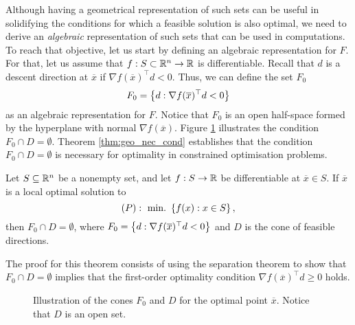 Although having a geometrical representation of such sets can be useful in solidifying the conditions for which a feasible solution is also optimal, we need to derive an \emph{algebraic} representation of such sets that can be used in computations. To reach that objective, let us start by defining an algebraic representation for $F$. For that, let us assume that $f : S \subset \mathbb{R}^n \to \mathbb{R}$ is differentiable. Recall that $d$ is a descent direction at $\overline{x}$ if $\nabla f(\overline{x})^\top d < 0$. Thus, we can define the set $F_0$
%
\begin{align*}
	F_0 = \left\{ d : \nabla f(\overline{x})^\top d < 0 \right \}	
\end{align*}
%
as an algebraic representation for $F$. Notice that $F_0$ is an open half-space formed by the hyperplane with normal $\nabla f(\overline{x})$. Figure \ref{cones_F0_D} illustrates the condition $F_0 \cap D = \emptyset$.
Theorem \ref{thm:geo_nec_cond} establishes that the condition $F_0 \cap D = \emptyset$ is necessary for optimality in constrained optimisation problems.
%
\begin{theorem}\label{thm:geo_nec_cond}
Let $S \subseteq \mathbb{R}^n$ be a nonempty set, and let $f:S \rightarrow \mathbb{R}$ be differentiable at $\overline{x} \in S$. If $\overline{x}$ is a local optimal solution to\\[-10pt]
$$(P) :~ \mathop{\text{min.~}}\left\{ f(x) : x \in S \right \},$$ 
then $F_0 \cap D = \emptyset$, where $F_0 = \left\{ d : \nabla f(\overline{x})^\top d < 0 \right \}$ and $D$ is the cone of feasible directions.
\end{theorem}
%
The proof for this theorem consists of using the separation theorem to show that $F_0 \cap D = \emptyset$ implies that the first-order optimality condition $\nabla f(\overline{x})^\top d \geq 0$ holds.
%
\begin{figure}
	\caption{Illustration of the cones $F_0$ and $D$ for the optimal point $\overline{x}$. Notice that $D$ is an open set.} \label{cones_F0_D}
\end{figure}

